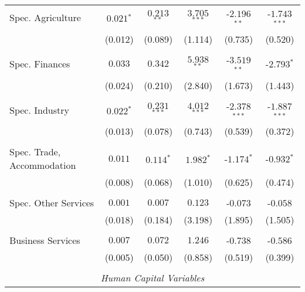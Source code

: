 \documentclass[11pt]{article}
\begin{document}
\begin{table}[!htbp]
{\begin{minipage}{\textwidth}
\begin{tabular}{@{\extracolsep{5pt}} lccccc}
Spec. Agriculture & $0.021$$^{*}$ & $0.213$$^{**}$ & $3.705$$^{***}$ & $ $-$2.196$$^{**}$ & $ $-$1.743$$^{***}$ \\ 
& (0.012) &  (0.089) & (1.114) & (0.735) & (0.520)\\
&\\
Spec. Finances  & $0.033$ & $0.342$ & $5.938$$^{**}$ & $ $-$3.519$$^{**}$ & $ $-$2.793$$^{*}$ \\ 
& (0.024) &  (0.210) & (2.840) & (1.673) & (1.443)\\
&\\
Spec. Industry & $0.022$$^{*}$ & $0.231$$^{***}$ & $4.012$$^{***}$ & $ $-$2.378$$^{***}$ & $ $-$1.887$$^{***}$ \\ 
& (0.013) &  (0.078) & (0.743) & (0.539) & (0.372)\\
&\\
Spec. Trade, Accommodation & $0.011$ & $0.114$$^{*}$ & $1.982$$^{*}$ & $ $-$1.174$$^{*}$ & $ $-$0.932$$^{*}$ \\
& (0.008) &  (0.068) & (1.010) & (0.625) & (0.474)\\
&\\
Spec. Other Services & $ 0.001$ & $ 0.007$ & $ 0.123$ & $ $-$0.073$ & $ $-$0.058$ \\
& (0.018) &  (0.184) & (3.198) & (1.895) & (1.505)\\
&\\
Business Services & $0.007$ & $0.072$ & $1.246$ & $ $-$0.738$ & $ $-$0.586$ \\
& (0.005) &  (0.050) & (0.858) & (0.519) & (0.399)\\
&\\
\multicolumn{6}{c}{\textit{Human Capital Variables}}\\


\end{tabular}
\end{minipage}}
\end{table}
\end{document}
